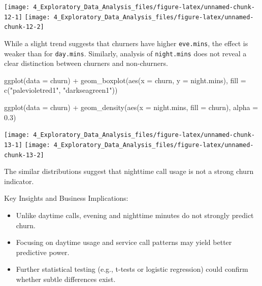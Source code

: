 \documentclass[
  11pt,
]{book}
\makeatletter
\newenvironment{Shaded}{}{}
\newcommand{\AttributeTok}[1]{#1}
\newcommand{\FloatTok}[1]{#1}
\newcommand{\FunctionTok}[1]{#1}
\newcommand{\NormalTok}[1]{#1}
\newcommand{\SpecialCharTok}[1]{\textcolor[rgb]{0.39,0.39,0.39}{#1}}
\newcommand{\StringTok}[1]{\textcolor[rgb]{0.39,0.39,0.39}{#1}}
\providecommand{\tightlist}{%
  \setlength{\itemsep}{0pt}\setlength{\parskip}{0pt}}
\newenvironment{kframe}{%
\medskip{}
\setlength{\fboxsep}{.8em}
 \def\at@end@of@kframe{}%
 \ifinner\ifhmode%
  \def\at@end@of@kframe{\end{minipage}}%
  \begin{minipage}{\columnwidth}%
 \fi\fi%
 \def\FrameCommand##1{\hskip\@totalleftmargin \hskip-\fboxsep
 \colorbox{shadecolor}{##1}\hskip-\fboxsep
     \hskip-\linewidth \hskip-\@totalleftmargin \hskip\columnwidth}%
 \MakeFramed {\advance\hsize-\width
   \@totalleftmargin\z@ \linewidth\hsize
   \@setminipage}}%
 {\par\unskip\endMakeFramed%
 \at@end@of@kframe}
\renewenvironment{Shaded}{\begin{kframe}}{\end{kframe}}
\theoremstyle{definition}
\theoremstyle{definition}
\theoremstyle{definition}
\theoremstyle{definition}
\theoremstyle{remark}
\makeatother
\begin{document}
\texttt{[image: 4\_Exploratory\_Data\_Analysis\_files/figure-latex/unnamed-chunk-12-1]} \texttt{[image: 4\_Exploratory\_Data\_Analysis\_files/figure-latex/unnamed-chunk-12-2]}

While a slight trend suggests that churners have higher \texttt{eve.mins}, the effect is weaker than for \texttt{day.mins}. Similarly, analysis of \texttt{night.mins} does not reveal a clear distinction between churners and non-churners.

\begin{Shaded}
\begin{Highlighting}[]
\FunctionTok{ggplot}\NormalTok{(}\AttributeTok{data =}\NormalTok{ churn) }\SpecialCharTok{+}
    \FunctionTok{geom\_boxplot}\NormalTok{(}\FunctionTok{aes}\NormalTok{(}\AttributeTok{x =}\NormalTok{ churn, }\AttributeTok{y =}\NormalTok{ night.mins), }\AttributeTok{fill =} \FunctionTok{c}\NormalTok{(}\StringTok{"palevioletred1"}\NormalTok{, }\StringTok{"darkseagreen1"}\NormalTok{))}

\FunctionTok{ggplot}\NormalTok{(}\AttributeTok{data =}\NormalTok{ churn) }\SpecialCharTok{+}
    \FunctionTok{geom\_density}\NormalTok{(}\FunctionTok{aes}\NormalTok{(}\AttributeTok{x =}\NormalTok{ night.mins, }\AttributeTok{fill =}\NormalTok{ churn), }\AttributeTok{alpha =} \FloatTok{0.3}\NormalTok{)}
\end{Highlighting}
\end{Shaded}

\texttt{[image: 4\_Exploratory\_Data\_Analysis\_files/figure-latex/unnamed-chunk-13-1]} \texttt{[image: 4\_Exploratory\_Data\_Analysis\_files/figure-latex/unnamed-chunk-13-2]}

The similar distributions suggest that nighttime call usage is not a strong churn indicator.

Key Insights and Business Implications:

\begin{itemize}
\tightlist
\item
  Unlike daytime calls, evening and nighttime minutes do not strongly predict churn.\\
\item
  Focusing on daytime usage and service call patterns may yield better predictive power.\\
\item
  Further statistical testing (e.g., t-tests or logistic regression) could confirm whether subtle differences exist.
\end{itemize}
\end{document}
